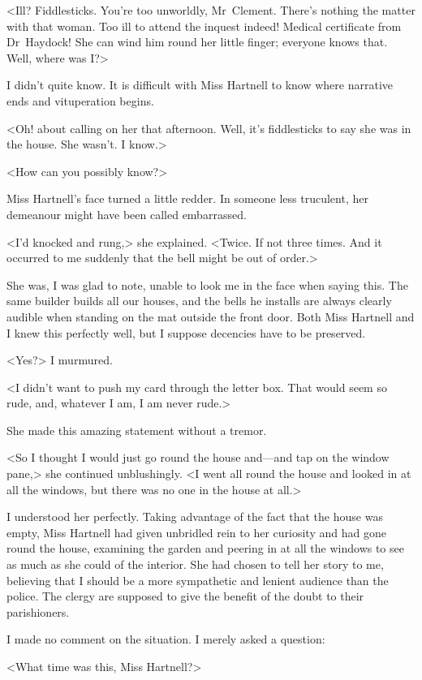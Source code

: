 <Ill? Fiddlesticks. You're too unworldly, Mr~Clement. There's nothing the matter with that woman. Too ill to attend the inquest indeed! Medical certificate from Dr~Haydock! She can wind him round her little finger; everyone knows that. Well, where was I?>

I didn't quite know. It is difficult with Miss Hartnell to know where narrative ends and vituperation begins.

<Oh! about calling on her that afternoon. Well, it's fiddlesticks to say she was in the house. She wasn't. I know.>

<How can you possibly know?>

Miss Hartnell's face turned a little redder. In someone less truculent, her demeanour might have been called embarrassed.

<I'd knocked and rung,> she explained. <Twice. If not three times. And it occurred to me suddenly that the bell might be out of order.>

She was, I was glad to note, unable to look me in the face when saying this. The same builder builds all our houses, and the bells he installs are always clearly audible when standing on the mat outside the front door. Both Miss Hartnell and I knew this perfectly well, but I suppose decencies have to be preserved.

<Yes?> I murmured.

<I didn't want to push my card through the letter box. That would seem so rude, and, whatever I am, I am never rude.>

She made this amazing statement without a tremor.

<So I thought I would just go round the house and—and tap on the window pane,> she continued unblushingly. <I went all round the house and looked in at all the windows, but there was no one in the house at all.>

I understood her perfectly. Taking advantage of the fact that the house was empty, Miss Hartnell had given unbridled rein to her curiosity and had gone round the house, examining the garden and peering in at all the windows to see as much as she could of the interior. She had chosen to tell her story to me, believing that I should be a more sympathetic and lenient audience than the police. The clergy are supposed to give the benefit of the doubt to their parishioners.

I made no comment on the situation. I merely asked a question:

<What time was this, Miss Hartnell?>

